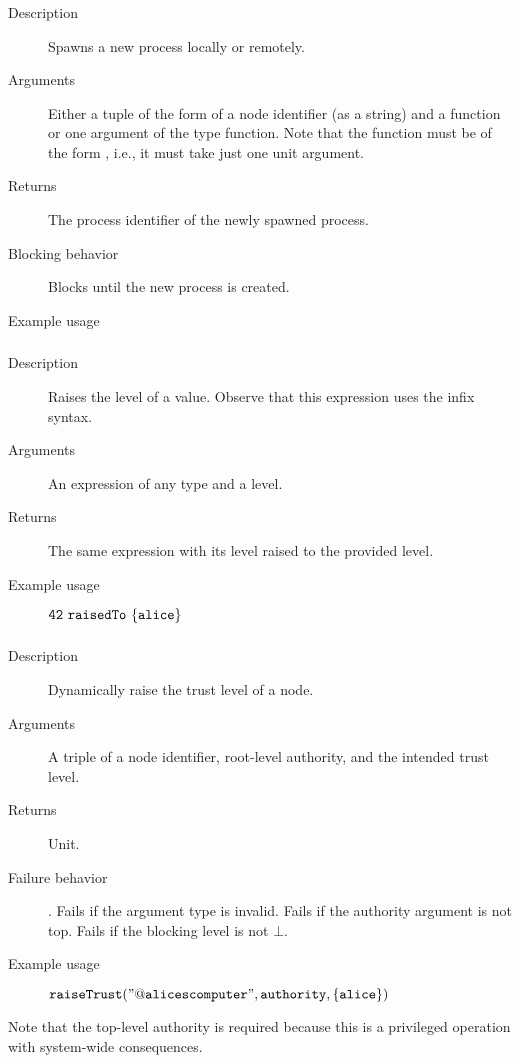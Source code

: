 \subsubsection{}
\begin{description}
    \item [Description] Spawns a new process locally or remotely.  
    \item [Arguments] Either a tuple of the form  of a node identifier (as a string) and a function 
or one argument of the type function. 
Note that the function must be of the form , i.e., it must take just one unit argument.
    \item [Returns] The process identifier of the newly spawned process.
    \item [Blocking behavior] Blocks until the new process is created.
    \item [Example usage] 

\end{description}

\subsubsection{}
\begin{description}
    \item [Description] Raises the level of a value. Observe that this expression uses the infix syntax.
    \item [Arguments] An expression of any type and a level.
    \item [Returns] The same expression with its level raised to the provided level.
    \item [Example usage] ${\mathtt{42\ raisedTo\ \{alice\}}}$
\end{description}

\subsubsection{}
\begin{description}
    \item [Description] Dynamically raise the trust level of a node.
    \item [Arguments] A triple of a node identifier, root-level authority, and the intended trust level.
    \item [Returns] Unit.
    \item [Failure behavior]. Fails if the argument type is invalid. Fails if the authority argument is not top.
 Fails if the blocking level is not $\bot$.
    \item [Example usage] ${\mathtt{raiseTrust("@alicescomputer", authority, \{alice\})}}$
\end{description}
Note that the top-level authority is required because this is a privileged operation with system-wide consequences. 




